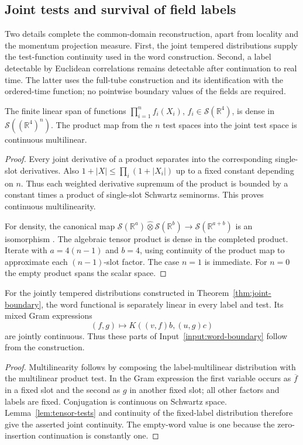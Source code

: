\subsection{Joint tests and survival of field labels}
\label{sec:boundary-detection}
Two details complete the common-domain reconstruction, apart from locality
and the momentum projection measure. First, the joint tempered distributions
supply the test-function continuity used in the word construction. Second,
a label detectable by Euclidean correlations remains detectable after
continuation to real time. The latter uses the full-tube construction and
its identification with the ordered-time function; no pointwise boundary
values of the fields are required.

\begin{lemma}\label{lem:tensor-tests}
The finite linear span of functions
$\prod_{i=1}^n f_i(X_i)$, $f_i\in\mathscr S(\mathbb R^4)$, is dense in
$\mathscr S((\mathbb R^4)^n)$. The product map from the $n$ test spaces
into the joint test space is continuous multilinear.
\end{lemma}
\begin{proof}
Every joint derivative of a product separates into the corresponding
single-slot derivatives. Also
$1+|X|\leq\prod_i(1+|X_i|)$ up to a fixed constant depending on $n$.
Thus each weighted derivative supremum of the product is bounded by a
constant times a product of single-slot Schwartz seminorms. This proves
continuous multilinearity.

For density, the canonical map
$\mathscr S(\mathbb R^a)\widehat\otimes\mathscr S(\mathbb R^b)
 \to\mathscr S(\mathbb R^{a+b})$ is an isomorphism
\cite[Theorem~51.6, Eq.~(51.3)]{Treves67}. The algebraic tensor
product is dense in the completed product. Iterate with
$a=4(n-1)$ and $b=4$, using continuity of the product map to
approximate each $(n-1)$-slot factor. The case $n=1$ is immediate. For $n=0$ the empty product spans the
scalar space.
\end{proof}

\begin{corollary}\label{cor:word-test-inputs}
For the jointly tempered distributions constructed in
Theorem~\ref{thm:joint-boundary}, the word functional is separately linear
in every label and test. Its mixed Gram expressions
\[
 (f,g)\longmapsto K((v,f)b,(u,g)c)
\]
are jointly continuous. Thus these parts of
Input~\ref{input:word-boundary} follow from the construction.
\end{corollary}
\begin{proof}
Multilinearity follows by composing the label-multilinear distribution
with the multilinear product test. In the Gram expression the first
variable occurs as $\overline f$ in a fixed slot and the second as $g$
in another fixed slot; all other factors and labels are fixed. Conjugation
is continuous on Schwartz space. Lemma~\ref{lem:tensor-tests} and continuity
of the fixed-label distribution therefore give the asserted joint
continuity. The empty-word value is one because the zero-insertion
continuation is constantly one.
\end{proof}

